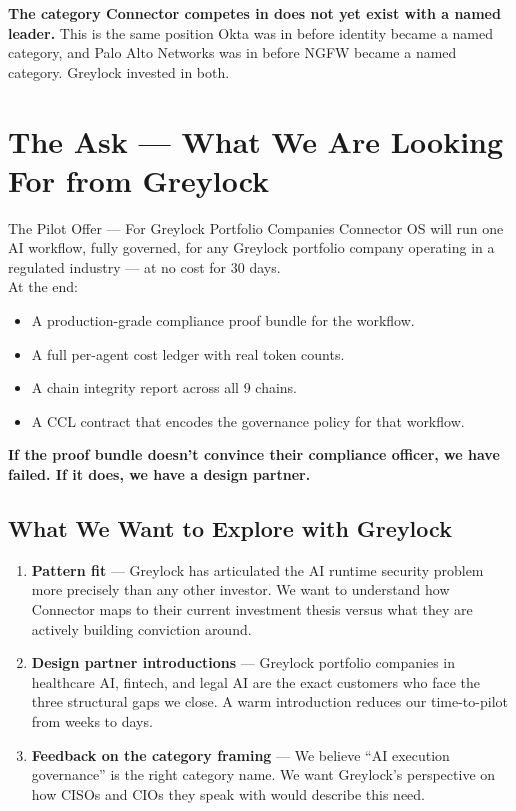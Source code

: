 \documentclass[11pt,a4paper]{article}
\begin{document}
\textbf{The category Connector competes in does not yet exist with a named leader.}
This is the same position Okta was in before identity became a named category,
and Palo Alto Networks was in before NGFW became a named category.
Greylock invested in both.

\clearpage

\section{The Ask — What We Are Looking For from Greylock}
\label{sec:ask}

\begin{keybox}{The Pilot Offer — For Greylock Portfolio Companies}
Connector OS will run one AI workflow, fully governed, for any Greylock portfolio company
operating in a regulated industry — at no cost for 30 days.\\[6pt]
At the end:
\begin{itemize}
  \item A production-grade compliance proof bundle for the workflow.
  \item A full per-agent cost ledger with real token counts.
  \item A chain integrity report across all 9 chains.
  \item A CCL contract that encodes the governance policy for that workflow.
\end{itemize}
\textbf{If the proof bundle doesn't convince their compliance officer, we have failed.
If it does, we have a design partner.}
\end{keybox}

\subsection{What We Want to Explore with Greylock}

\begin{enumerate}
  \item \textbf{Pattern fit} — Greylock has articulated the AI runtime security problem more precisely
        than any other investor. We want to understand how Connector maps to their current investment
        thesis versus what they are actively building conviction around.

  \item \textbf{Design partner introductions} — Greylock portfolio companies in healthcare AI,
        fintech, and legal AI are the exact customers who face the three structural gaps we close.
        A warm introduction reduces our time-to-pilot from weeks to days.

  \item \textbf{Feedback on the category framing} — We believe ``AI execution governance'' is the
        right category name. We want Greylock's perspective on how CISOs and CIOs they speak with
        would describe this need.
\end{enumerate}
\end{document}
